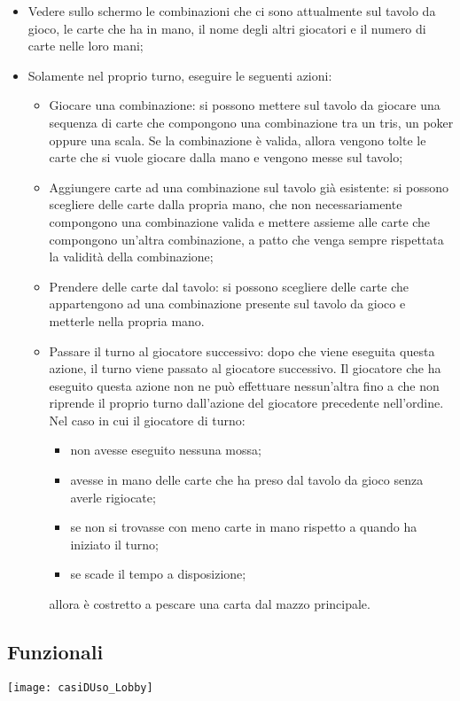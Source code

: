\begin{itemize}
    \item Vedere sullo schermo le combinazioni che ci sono attualmente sul tavolo da gioco, le carte che ha in mano, il nome degli altri giocatori e il numero di carte nelle loro mani;
    \item Solamente nel proprio turno, eseguire le seguenti azioni:
    \begin{itemize}
        \item Giocare una combinazione: si possono mettere sul tavolo da giocare una sequenza di carte che compongono una combinazione tra un tris, un poker oppure una scala.
        Se la combinazione è valida, allora vengono tolte le carte che si vuole giocare dalla mano e vengono messe sul tavolo;
        \item Aggiungere carte ad una combinazione sul tavolo già esistente: si possono scegliere delle carte dalla propria mano, che non necessariamente compongono una combinazione valida e mettere assieme alle carte che compongono un’altra combinazione, a patto che venga sempre rispettata la validità della combinazione;
        \item Prendere delle carte dal tavolo: si possono scegliere delle carte che appartengono ad una combinazione presente sul tavolo da gioco e metterle nella propria mano.
        \item Passare il turno al giocatore successivo: dopo che viene eseguita questa azione, il turno viene passato al giocatore successivo.
        Il giocatore che ha eseguito questa azione non ne può effettuare nessun’altra fino a che non riprende il proprio turno dall’azione del giocatore precedente nell’ordine.
        Nel caso in cui il giocatore di turno:
        \begin{itemize}
            \item non avesse eseguito nessuna mossa;
            \item avesse in mano delle carte che ha preso dal tavolo da gioco senza averle rigiocate;
            \item se non si trovasse con meno carte in mano rispetto a quando ha iniziato il turno;
            \item se scade il tempo a disposizione;
        \end{itemize}
        allora è costretto a pescare una carta dal mazzo principale.
    \end{itemize}
\end{itemize}

\subsection{Funzionali}
\begin{center}
    \texttt{[image: casiDUso\_Lobby]}
\end{center}
